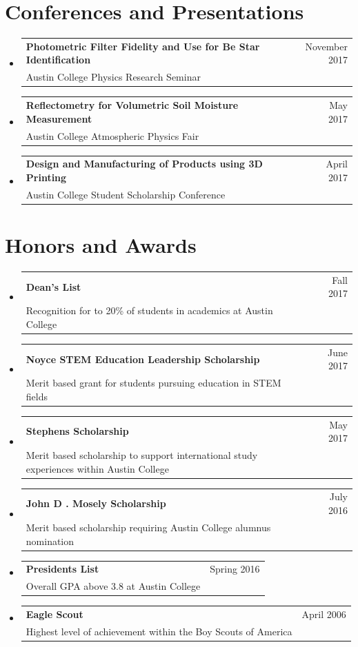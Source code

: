 \documentclass[A4,11pt]{article}
\makeatletter
\newcommand{\CVSubheading}[4]{
  \vspace{-2pt}\item
    \begin{tabular*}{0.97\textwidth}[t]{l@{\extracolsep{\fill}}r}
      \textbf{#1} & #2 \\
      \small#3 & \small #4 \\
    \end{tabular*}\vspace{-7pt}
}
\newcommand{\CVSubHeadingListStart}{\begin{itemize}[leftmargin=0.5cm, label={}]}
\newcommand{\CVSubHeadingListEnd}{\end{itemize}}
\makeatother
\begin{document}

\section{Conferences and Presentations}
  \CVSubHeadingListStart
    \CVSubheading
      {Photometric Filter Fidelity and Use for Be Star Identification}{November 2017}
      {Austin College Physics Research Seminar}{}
    \CVSubheading
      {Reflectometry for Volumetric Soil Moisture Measurement}{May 2017}
      {Austin College Atmospheric Physics Fair}{}
    \CVSubheading
      {Design and Manufacturing of Products using 3D Printing}{April 2017}
      {Austin College Student Scholarship Conference}{}
  \CVSubHeadingListEnd

\section{Honors and Awards}
  \CVSubHeadingListStart
    \CVSubheading
      {Dean's List}{Fall 2017}
      {Recognition for to 20\% of students in academics at Austin College}{}
    \CVSubheading
      {Noyce STEM Education Leadership Scholarship}{June 2017}
      {Merit based grant for students pursuing education in STEM fields}{}
    \CVSubheading
      {Stephens Scholarship}{May 2017}
      {Merit based scholarship to support international study experiences within Austin College}{}
    \CVSubheading
      {John D . Mosely Scholarship}{July 2016}
      {Merit based scholarship requiring Austin College alumnus nomination}{}
    \CVSubheading
      {Presidents List}{Spring 2016}
      {Overall GPA above 3.8 at Austin College}{}
    \CVSubheading
      {Eagle Scout}{April 2006}
      {Highest level of achievement within the Boy Scouts of America}{}
  \CVSubHeadingListEnd

\end{document}
